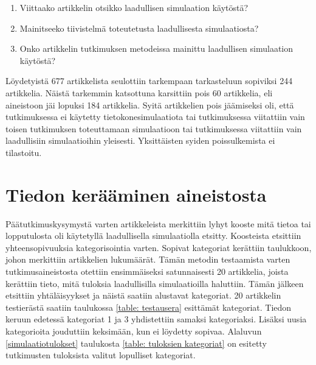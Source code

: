 \documentclass[utf8]{gradu3}
\begin{document}
\begin{enumerate}
    \item Viittaako artikkelin otsikko laadullisen simulaation käytöstä?
    \item Mainitseeko tiivistelmä toteutetusta laadullisesta simulaatiosta?
    \item Onko artikkelin tutkimuksen metodeissa mainittu laadullisen simulaation käytöstä?
\end{enumerate}

Löydetyistä 677 artikkelista seulottiin tarkempaan tarkasteluun sopiviksi 244 artikkelia. 
Näistä tarkemmin katsottuna karsittiin pois 60 artikkelia, 
eli aineistoon jäi lopuksi 184 artikkelia. 
Syitä artikkelien pois jäämiseksi oli, 
että tutkimuksessa ei käytetty tietokonesimulaatiota tai 
tutkimuksessa viitattiin vain toisen tutkimuksen toteuttamaan simulaatioon tai
tutkimuksessa viitattiin vain laadullisiin simulaatioihin yleisesti.
Yksittäisten syiden poissulkemista ei tilastoitu.

\section{Tiedon kerääminen aineistosta} \label{tiedon keruu}
Päätutkimuskysymystä varten artikkeleista merkittiin lyhyt kooste mitä tietoa tai
lopputulosta oli käytetyllä laadullisella simulaatiolla etsitty. 
Koosteista etsittiin yhteensopivuuksia kategorisointia varten. 
Sopivat kategoriat kerättiin taulukkoon, johon merkittiin artikkelien lukumäärät.
Tämän metodin testaamista varten tutkimusaineistosta otettiin ensimmäiseksi
satunnaisesti 20 artikkelia, joista kerättiin tieto, mitä tuloksia laadullisilla
simulaatioilla haluttiin. Tämän jälkeen etsittiin yhtäläisyykset ja näistä saatiin
alustavat kategoriat. 20 artikkelin testierästä saatiin taulukossa 
\ref{table: testausera} esittämät kategoriat. Tiedon keruun edetessä kategoriat 1
ja 3 yhdistettiin samaksi kategoriaksi. Lisäksi uusia kategorioita jouduttiin
keksimään, kun ei löydetty sopivaa. Alaluvun \ref{simulaatiotulokset} taulukosta
\ref{table: tuloksien kategoriat} on esitetty tutkimusten tuloksista valitut
lopulliset kategoriat.
\end{document}
